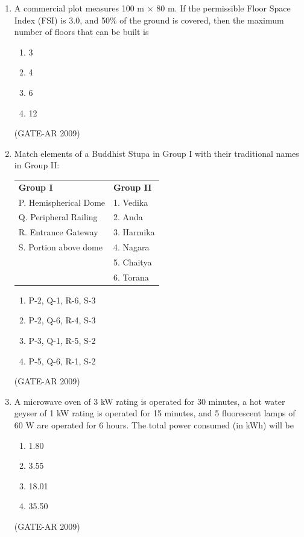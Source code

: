 \documentclass[a4paper,10pt]{article}
\begin{document}
\begin{enumerate}
    \item A commercial plot measures 100 m $\times$ 80 m. If the permissible Floor Space Index (FSI) is 3.0, and 50\% of the ground is covered, then the maximum number of floors that can be built is 
    \begin{multicols}{4}
	\begin{enumerate}
        \item 3
        \item 4
        \item 6
        \item 12
    \end{enumerate}
	\end{multicols}
    \hfill (GATE-AR 2009)

    \item Match elements of a Buddhist Stupa in Group I with their traditional names in Group II:  \\
	\begin{tabular}{ l l }
	\textbf{Group I} & \textbf{Group II} \\
	P. Hemispherical Dome & 1. Vedika \\
	Q. Peripheral Railing & 2. Anda \\
	R. Entrance Gateway & 3. Harmika \\
	S. Portion above dome & 4. Nagara \\
	& 5. Chaitya \\
	& 6. Torana \\
	\end{tabular}
	\begin{multicols}{2}
	\begin{enumerate}
        \item P-2, Q-1, R-6, S-3
        \item P-2, Q-6, R-4, S-3
        \item P-3, Q-1, R-5, S-2
        \item P-5, Q-6, R-1, S-2
    \end{enumerate}
	\end{multicols}
    \hfill (GATE-AR 2009)

    \item A microwave oven of 3 kW rating is operated for 30 minutes, a hot water geyser of 1 kW rating is operated for 15 minutes, and 5 fluorescent lamps of 60 W are operated for 6 hours. The total power consumed (in kWh) will be 
    \begin{multicols}{4}
	\begin{enumerate}
        \item 1.80
        \item 3.55
        \item 18.01
        \item 35.50
    \end{enumerate}
	\end{multicols}
    \hfill (GATE-AR 2009)


\end{enumerate}
\end{document}
